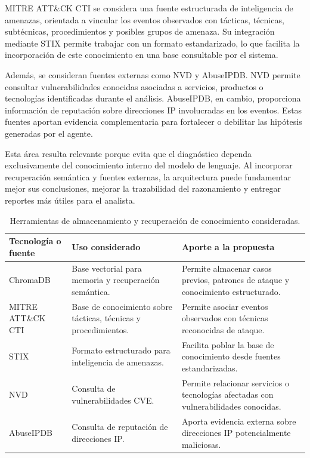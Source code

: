 MITRE ATT\&CK CTI se considera una fuente estructurada de inteligencia de amenazas, orientada a vincular los eventos observados con tácticas, técnicas, subtécnicas, procedimientos y posibles grupos de amenaza. Su integración mediante STIX permite trabajar con un formato estandarizado, lo que facilita la incorporación de este conocimiento en una base consultable por el sistema.

Además, se consideran fuentes externas como NVD y AbuseIPDB. NVD permite consultar vulnerabilidades conocidas asociadas a servicios, productos o tecnologías identificadas durante el análisis. AbuseIPDB, en cambio, proporciona información de reputación sobre direcciones IP involucradas en los eventos. Estas fuentes aportan evidencia complementaria para fortalecer o debilitar las hipótesis generadas por el agente.

Esta área resulta relevante porque evita que el diagnóstico dependa exclusivamente del conocimiento interno del modelo de lenguaje. Al incorporar recuperación semántica y fuentes externas, la arquitectura puede fundamentar mejor sus conclusiones, mejorar la trazabilidad del razonamiento y entregar reportes más útiles para el analista.

\begin{table}[H]
\centering
\caption{Herramientas de almacenamiento y recuperación de conocimiento consideradas.}
\label{tab:almacenamiento_recuperacion}
\renewcommand{\arraystretch}{1.25}
\begin{tabularx}{\textwidth}{p{2.4cm} X X}
\toprule
\textbf{Tecnología o fuente} & \textbf{Uso considerado} & \textbf{Aporte a la propuesta} \\
\midrule
ChromaDB & Base vectorial para memoria y recuperación semántica. & Permite almacenar casos previos, patrones de ataque y conocimiento estructurado. \\
\midrule
MITRE ATT\&CK CTI & Base de conocimiento sobre tácticas, técnicas y procedimientos. & Permite asociar eventos observados con técnicas reconocidas de ataque. \\
\midrule
STIX & Formato estructurado para inteligencia de amenazas. & Facilita poblar la base de conocimiento desde fuentes estandarizadas. \\
\midrule
NVD & Consulta de vulnerabilidades CVE. & Permite relacionar servicios o tecnologías afectadas con vulnerabilidades conocidas. \\
\midrule
AbuseIPDB & Consulta de reputación de direcciones IP. & Aporta evidencia externa sobre direcciones IP potencialmente maliciosas. \\
\bottomrule
\end{tabularx}
\end{table}

